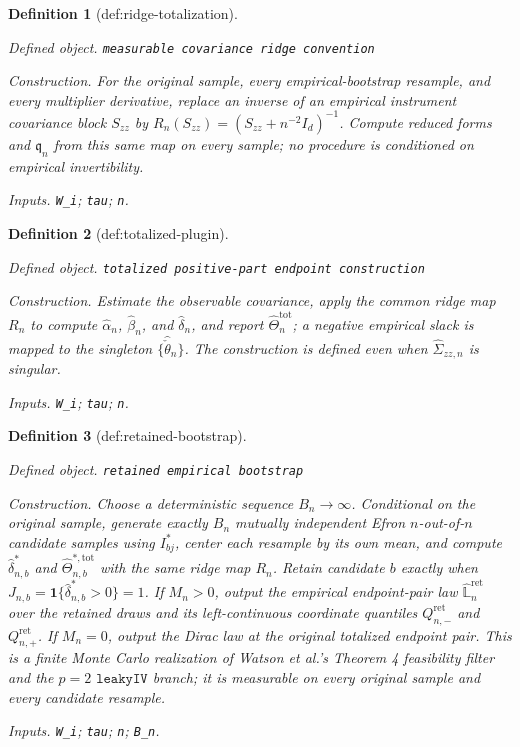 \documentclass{article}
\newtheorem{definition}{Definition}
\begin{document}
\begin{definition}[def:ridge-totalization]\label{def:ridge-totalization}
\par\smallskip\noindent\emph{Defined object.} \texttt{measurable covariance ridge convention}
\par\smallskip\noindent\emph{Construction.} For the original sample, every empirical-bootstrap resample, and every multiplier derivative, replace an inverse of an empirical instrument covariance block \(S_{zz}\) by \(R_n(S_{zz})=(S_{zz}+n^{-2}I_d)^{-1}\). Compute reduced forms and \(\mathfrak q_n\) from this same map on every sample; no procedure is conditioned on empirical invertibility.
\par\smallskip\noindent\emph{Inputs.} \texttt{W\_\allowbreak{}i}; \texttt{tau}; \texttt{n}.
\end{definition}

\begin{definition}[def:totalized-plugin]\label{def:totalized-plugin}
\par\smallskip\noindent\emph{Defined object.} \texttt{totalized positive-\allowbreak{}part endpoint construction}
\par\smallskip\noindent\emph{Construction.} Estimate the observable covariance, apply the common ridge map \(R_n\) to compute \(\widehat\alpha_n\), \(\widehat\beta_n\), and \(\widehat\delta_n\), and report \(\widehat\Theta_n^{\mathrm{tot}}\); a negative empirical slack is mapped to the singleton \(\{\widehat{\check\theta}_n\}\). The construction is defined even when \(\widehat\Sigma_{zz,n}\) is singular.
\par\smallskip\noindent\emph{Inputs.} \texttt{W\_\allowbreak{}i}; \texttt{tau}; \texttt{n}.
\end{definition}

\begin{definition}[def:retained-bootstrap]\label{def:retained-bootstrap}
\par\smallskip\noindent\emph{Defined object.} \texttt{retained empirical bootstrap}
\par\smallskip\noindent\emph{Construction.} Choose a deterministic sequence \(B_n\to\infty\). Conditional on the original sample, generate exactly \(B_n\) mutually independent Efron \(n\)-out-of-\(n\) candidate samples using \(I_{bj}^{*}\), center each resample by its own mean, and compute \(\widehat\delta_{n,b}^{*}\) and \(\widehat\Theta_{n,b}^{*,\mathrm{tot}}\) with the same ridge map \(R_n\). Retain candidate \(b\) exactly when \(J_{n,b}=\mathbf 1\{\widehat\delta_{n,b}^{*}>0\}=1\). If \(M_n>0\), output the empirical endpoint-pair law \(\widehat{\mathbb L}_n^{\mathrm{ret}}\) over the retained draws and its left-continuous coordinate quantiles \(Q_{n,-}^{\mathrm{ret}}\) and \(Q_{n,+}^{\mathrm{ret}}\). If \(M_n=0\), output the Dirac law at the original totalized endpoint pair. This is a finite Monte Carlo realization of Watson et al.'s Theorem 4 feasibility filter and the \(p=2\) \(\texttt{leakyIV}\) branch; it is measurable on every original sample and every candidate resample.
\par\smallskip\noindent\emph{Inputs.} \texttt{W\_\allowbreak{}i}; \texttt{tau}; \texttt{n}; \texttt{B\_\allowbreak{}n}.
\end{definition}
\end{document}
